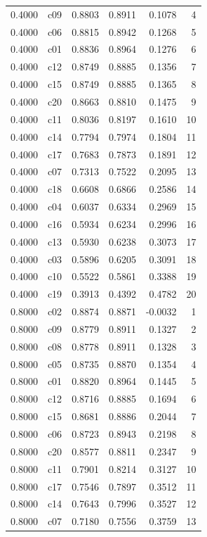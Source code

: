 \begin{table}[htbp]
\begin{tabular}{lrrrrr}
0.4000 & c09 & 0.8803 & 0.8911 & 0.1078 & 4 \\
0.4000 & c06 & 0.8815 & 0.8942 & 0.1268 & 5 \\
0.4000 & c01 & 0.8836 & 0.8964 & 0.1276 & 6 \\
0.4000 & c12 & 0.8749 & 0.8885 & 0.1356 & 7 \\
0.4000 & c15 & 0.8749 & 0.8885 & 0.1365 & 8 \\
0.4000 & c20 & 0.8663 & 0.8810 & 0.1475 & 9 \\
0.4000 & c11 & 0.8036 & 0.8197 & 0.1610 & 10 \\
0.4000 & c14 & 0.7794 & 0.7974 & 0.1804 & 11 \\
0.4000 & c17 & 0.7683 & 0.7873 & 0.1891 & 12 \\
0.4000 & c07 & 0.7313 & 0.7522 & 0.2095 & 13 \\
0.4000 & c18 & 0.6608 & 0.6866 & 0.2586 & 14 \\
0.4000 & c04 & 0.6037 & 0.6334 & 0.2969 & 15 \\
0.4000 & c16 & 0.5934 & 0.6234 & 0.2996 & 16 \\
0.4000 & c13 & 0.5930 & 0.6238 & 0.3073 & 17 \\
0.4000 & c03 & 0.5896 & 0.6205 & 0.3091 & 18 \\
0.4000 & c10 & 0.5522 & 0.5861 & 0.3388 & 19 \\
0.4000 & c19 & 0.3913 & 0.4392 & 0.4782 & 20 \\
0.8000 & c02 & 0.8874 & 0.8871 & -0.0032 & 1 \\
0.8000 & c09 & 0.8779 & 0.8911 & 0.1327 & 2 \\
0.8000 & c08 & 0.8778 & 0.8911 & 0.1328 & 3 \\
0.8000 & c05 & 0.8735 & 0.8870 & 0.1354 & 4 \\
0.8000 & c01 & 0.8820 & 0.8964 & 0.1445 & 5 \\
0.8000 & c12 & 0.8716 & 0.8885 & 0.1694 & 6 \\
0.8000 & c15 & 0.8681 & 0.8886 & 0.2044 & 7 \\
0.8000 & c06 & 0.8723 & 0.8943 & 0.2198 & 8 \\
0.8000 & c20 & 0.8577 & 0.8811 & 0.2347 & 9 \\
0.8000 & c11 & 0.7901 & 0.8214 & 0.3127 & 10 \\
0.8000 & c17 & 0.7546 & 0.7897 & 0.3512 & 11 \\
0.8000 & c14 & 0.7643 & 0.7996 & 0.3527 & 12 \\
0.8000 & c07 & 0.7180 & 0.7556 & 0.3759 & 13 \\

\end{tabular}
\end{table}
